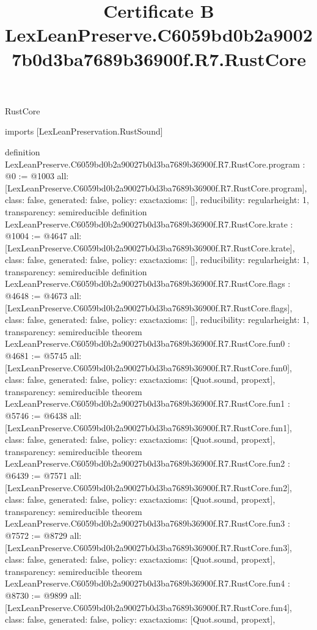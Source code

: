 \begin{lexlean}{RustCore}
\title{Certificate B LexLeanPreserve.C6059bd0b2a90027b0d3ba7689b36900f.R7.RustCore}
\begin{coremodule}
imports [LexLeanPreservation.RustSound]

definition LexLeanPreserve.C6059bd0b2a90027b0d3ba7689b36900f.R7.RustCore.program : @0 := @1003 {
  all: [LexLeanPreserve.C6059bd0b2a90027b0d3ba7689b36900f.R7.RustCore.program],
  class: false,
  generated: false,
  policy: exact{axioms: []},
  reducibility: regular{height: 1},
  transparency: semireducible
}
definition LexLeanPreserve.C6059bd0b2a90027b0d3ba7689b36900f.R7.RustCore.krate : @1004 := @4647 {
  all: [LexLeanPreserve.C6059bd0b2a90027b0d3ba7689b36900f.R7.RustCore.krate],
  class: false,
  generated: false,
  policy: exact{axioms: []},
  reducibility: regular{height: 1},
  transparency: semireducible
}
definition LexLeanPreserve.C6059bd0b2a90027b0d3ba7689b36900f.R7.RustCore.flags : @4648 := @4673 {
  all: [LexLeanPreserve.C6059bd0b2a90027b0d3ba7689b36900f.R7.RustCore.flags],
  class: false,
  generated: false,
  policy: exact{axioms: []},
  reducibility: regular{height: 1},
  transparency: semireducible
}
theorem LexLeanPreserve.C6059bd0b2a90027b0d3ba7689b36900f.R7.RustCore.fun0 : @4681 := @5745 {
  all: [LexLeanPreserve.C6059bd0b2a90027b0d3ba7689b36900f.R7.RustCore.fun0],
  class: false,
  generated: false,
  policy: exact{axioms: [Quot.sound, propext]},
  transparency: semireducible
}
theorem LexLeanPreserve.C6059bd0b2a90027b0d3ba7689b36900f.R7.RustCore.fun1 : @5746 := @6438 {
  all: [LexLeanPreserve.C6059bd0b2a90027b0d3ba7689b36900f.R7.RustCore.fun1],
  class: false,
  generated: false,
  policy: exact{axioms: [Quot.sound, propext]},
  transparency: semireducible
}
theorem LexLeanPreserve.C6059bd0b2a90027b0d3ba7689b36900f.R7.RustCore.fun2 : @6439 := @7571 {
  all: [LexLeanPreserve.C6059bd0b2a90027b0d3ba7689b36900f.R7.RustCore.fun2],
  class: false,
  generated: false,
  policy: exact{axioms: [Quot.sound, propext]},
  transparency: semireducible
}
theorem LexLeanPreserve.C6059bd0b2a90027b0d3ba7689b36900f.R7.RustCore.fun3 : @7572 := @8729 {
  all: [LexLeanPreserve.C6059bd0b2a90027b0d3ba7689b36900f.R7.RustCore.fun3],
  class: false,
  generated: false,
  policy: exact{axioms: [Quot.sound, propext]},
  transparency: semireducible
}
theorem LexLeanPreserve.C6059bd0b2a90027b0d3ba7689b36900f.R7.RustCore.fun4 : @8730 := @9899 {
  all: [LexLeanPreserve.C6059bd0b2a90027b0d3ba7689b36900f.R7.RustCore.fun4],
  class: false,
  generated: false,
  policy: exact{axioms: [Quot.sound, propext]},
}
\end{coremodule}
\end{lexlean}
